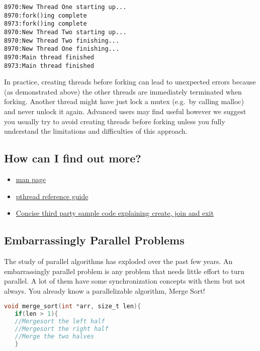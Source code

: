 \begin{verbatim}
8970:New Thread One starting up...
8970:fork()ing complete
8973:fork()ing complete
8970:New Thread Two starting up...
8970:New Thread Two finishing...
8970:New Thread One finishing...
8970:Main thread finished
8973:Main thread finished
\end{verbatim}

In practice, creating threads before forking can lead to unexpected errors because (as demonstrated above) the other threads are immediately terminated when forking. Another thread might have just lock a mutex (e.g.~by calling malloc) and never unlock it again. Advanced users may find  useful however we suggest you usually try to avoid creating threads before forking unless you fully understand the limitations and difficulties of this approach.

\subsection{How can I find out more?}\label{how-can-i-find-out-more}

\begin{itemize}
\item \href{http://man7.org/linux/man-pages/man3/pthread_create.3.html}{man page} 
\item \href{http://man7.org/linux/man-pages/man7/pthreads.7.html}{pthread reference guide} 
\item \href{http://www.thegeekstuff.com/2012/04/terminate-c-thread/}{Concise third party sample code explaining create, join and exit}
\end{itemize}


\subsection{Embarrassingly Parallel Problems}\label{embarrassingly-parallel-problems}

The study of parallel algorithms has exploded over the past few years. An embarrassingly parallel problem is any problem that needs little effort to turn parallel. A lot of them have some synchronization concepts with them but not always. You already know a parallelizable algorithm, Merge Sort!

\begin{lstlisting}[language=C]
void merge_sort(int *arr, size_t len){
   if(len > 1){
   //Mergesort the left half
   //Mergesort the right half
   //Merge the two halves
   }
\end{lstlisting}

